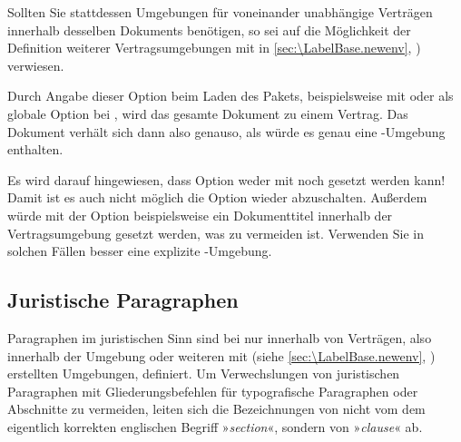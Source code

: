 Sollten Sie stattdessen Umgebungen für voneinander unabhängige Verträgen
innerhalb desselben Dokuments benötigen, so sei auf die Möglichkeit der
Definition weiterer Vertragsumgebungen mit
 in
\autoref{sec:\LabelBase.newenv},
) verwiesen.%
\EndIndexGroup

\begin{Declaration}
\end{Declaration}
Durch Angabe dieser Option beim Laden des Pakets, beispielsweise mit
%
 oder als globale Option bei
%
, wird das gesamte Dokument
zu einem Vertrag. Das Dokument verhält sich dann also genauso, als würde es
genau eine -Umgebung enthalten.

Es wird darauf hingewiesen, dass Option 
weder mit  noch
 gesetzt werden kann!  Damit ist es auch
nicht möglich die Option wieder abzuschalten. Außerdem würde mit der Option
beispielsweise ein Dokumenttitel innerhalb der Vertragsumgebung
gesetzt werden, was zu vermeiden ist. Verwenden Sie in solchen Fällen
besser eine explizite -Umgebung.%
\EndIndexGroup


\subsection{Juristische Paragraphen}
\label{sec:scrjura.clause}
\BeginIndexGroup
{} 

Paragraphen im juristischen Sinn sind bei  nur innerhalb von
Verträgen, also innerhalb der Umgebung  oder
weiteren mit  (siehe
\autoref{sec:\LabelBase.newenv},
) erstellten Umgebungen,
definiert. Um Verwechslungen von juristischen Paragraphen
mit Gliederungsbefehlen für typografische Paragraphen oder Abschnitte zu
vermeiden, leiten sich die Bezeichnungen von  nicht vom dem
eigentlich korrekten englischen Begriff »\emph{section}«, sondern von
»\emph{clause}« ab.

